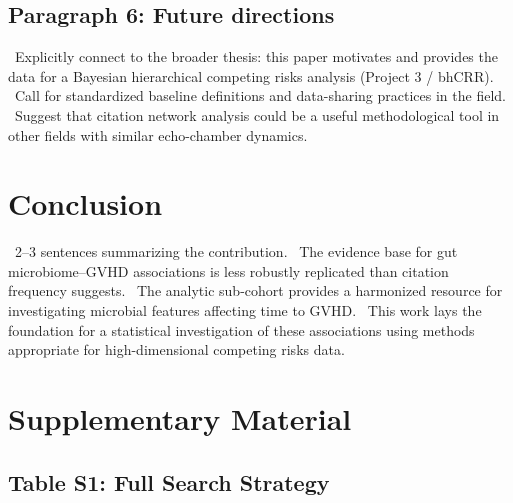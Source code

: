 \documentclass[11pt,a4paper]{article}
\newcommand{\todoitem}[1]{\textcolor{blue!70!black}{\textbullet~#1}}
\begin{document}
\subsection*{Paragraph 6: Future directions}
\todoitem{Explicitly connect to the broader thesis: this paper motivates and provides the data for a Bayesian hierarchical competing risks analysis (Project 3 / bhCRR).}
\todoitem{Call for standardized baseline definitions and data-sharing practices in the field.}
\todoitem{Suggest that citation network analysis could be a useful methodological tool in other fields with similar echo-chamber dynamics.}


\section{Conclusion}
\label{sec:conclusion}

\todoitem{2--3 sentences summarizing the contribution.}
\todoitem{The evidence base for gut microbiome--GVHD associations is less robustly replicated than citation frequency suggests.}
\todoitem{The analytic sub-cohort provides a harmonized resource for investigating microbial features affecting time to GVHD.}
\todoitem{This work lays the foundation for a statistical investigation of these associations using methods appropriate for high-dimensional competing risks data.}


\newpage
\printbibliography[heading=bibintoc, title={References}]


\newpage
\appendix
\section{Supplementary Material}
\label{sec:supplementary}

\subsection{Table S1: Full Search Strategy}
\label{subsec:S1}
\end{document}

